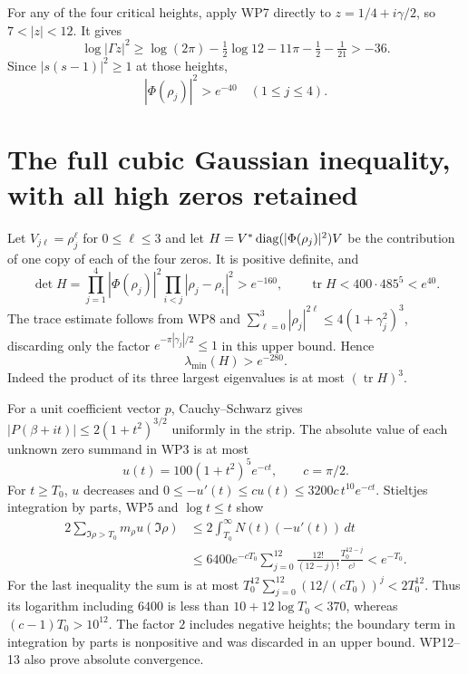 For any of the four critical heights, apply WP7 directly to
$z=1/4+i\gamma/2$, so $7<|z|<12$. It gives
\[
 \log|\Gamma z|^2\ge
 \log(2\pi)-\tfrac12\log12-11\pi-\tfrac12-\tfrac1{21}>-36.
\]
Since $|s(s-1)|^2\ge1$ at those heights,
\[
             |\Phi(\rho_j)|^2>e^{-40}\quad(1\le j\le4).
                                                                  \tag{WP9}
\]

\section{The full cubic Gaussian inequality, with all high zeros retained}
Let $V_{j\ell}=\rho_j^\ell$ for $0\le\ell\le3$ and let
$H=V^*\operatorname{diag}(|\Phi(\rho_j)|^2)V$ be the contribution of one
copy of each of the four zeros. It is positive definite, and
\[
 \det H=\prod_{j=1}^4|\Phi(\rho_j)|^2
                   \prod_{i<j}|\rho_j-\rho_i|^2>e^{-160},
 \qquad \operatorname{tr}H<400\cdot485^5<e^{40}.              \tag{WP10}
\]
The trace estimate follows from WP8 and
$\sum_{\ell=0}^3|\rho_j|^{2\ell}\le4(1+\gamma_j^2)^3$,
discarding only the factor $e^{-\pi|\gamma_j|/2}\le1$ in this
upper bound. Hence
\[
                         \lambda_{\min}(H)>e^{-280}.           \tag{WP11}
\]
Indeed the product of its three largest eigenvalues is at most
$(\operatorname{tr}H)^3$.

For a unit coefficient vector $p$, Cauchy--Schwarz gives
$|P(\beta+it)|\le2(1+t^2)^{3/2}$ uniformly in the strip.
The absolute value of each unknown zero summand in WP3 is at
most
\[
                  u(t)=100(1+t^2)^5e^{-ct},\qquad c=\pi/2.
                                                                  \tag{WP12}
\]
For $t\ge T_0$, $u$ decreases and
$0\le-u'(t)\le c u(t)\le3200c\,t^{10}e^{-ct}$.
Stieltjes integration by parts, WP5 and $\log t\le t$ show
\[
 \begin{split}
 2\sum_{\Im\rho>T_0}m_\rho u(\Im\rho)
 &\le2\int_{T_0}^{\infty}N(t)(-u'(t))\,dt\\
 &\le6400e^{-cT_0}\sum_{j=0}^{12}
             \frac{12!}{(12-j)!}\frac{T_0^{12-j}}{c^j}
 <e^{-T_0}.
 \end{split}                                                   \tag{WP13}
\]
For the last inequality the sum is at most
$T_0^{12}\sum_{j=0}^{12}(12/(cT_0))^j<2T_0^{12}$.
Thus its logarithm including $6400$ is less than
$10+12\log T_0<370$, whereas $(c-1)T_0>10^{12}$.
The factor $2$ includes negative heights; the boundary term in
integration by parts is nonpositive and was discarded in an
upper bound. WP12--13 also prove absolute convergence.

